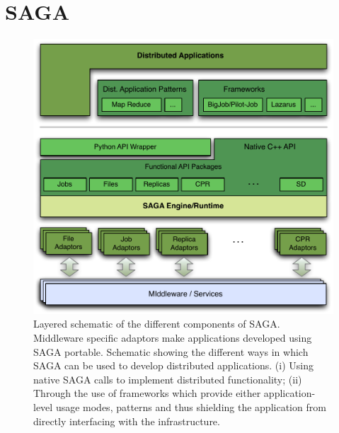 \section {SAGA}

\begin{figure}
  \includegraphics[width=1.0\textwidth]{./figures/figure_02}
  \caption{\footnotesize Layered schematic of the different
    components of SAGA.  Middleware specific adaptors make
    applications developed using SAGA portable.  Schematic showing the
    different ways in which SAGA can be used to develop distributed
    applications. (i) Using native SAGA calls to implement distributed
    functionality; (ii) Through the use of frameworks which provide
    either application-level usage modes, patterns and thus shielding
    the application from directly interfacing with the
    infrastructure.}
 \label{sagalayer}
\end{figure}
	
	
